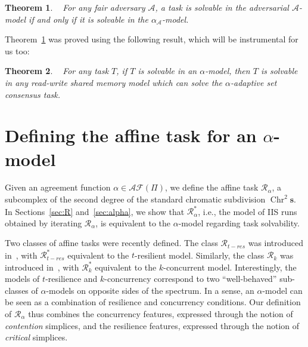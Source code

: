\documentclass[a4paper]{article}
\newtheorem{theorem}{Theorem}
\newcommand{\remove}[1]{}
\def\A{\ensuremath{\mathcal{A}}}
\def\R{\ensuremath{\mathcal{R}}}
\def\fair{\textit{fair}}
\def\s {\mathbf{s}}
\def\Chr{\operatorname{Chr}}
\begin{document}
\begin{theorem}~\cite{KR17}
\label{th:adv:task}
For any {\fair} adversary $\A$, a task is solvable in the adversarial
$\A$-model if and only if it is solvable in the $\alpha_\A$-model. %
\end{theorem} 
%

Theorem~\ref{th:adv:task} was proved using the following result, which
will be instrumental for us too:
\begin{theorem}~\cite{KR17}
\label{read/writeAndConsensus}
For any task $T$, if $T$ is solvable in an $\alpha$-model, then $T$ is solvable in \emph{any} read-write shared 
memory model which can solve the $\alpha$-adaptive set consensus task.
\end{theorem}

\remove{
%
\begin{theorem}~\cite{KR17}
  \label{thm:AdaptiveAgreement}
There exists an \emph{$\alpha$-adaptive}  set consensus algorithm
that, in any run with a participating set $P$,
satisfies the following properties: (\emph{Termination}) All \emph{correct} processes
eventually decide;
%
(\emph{Agreement}) At most $\alpha(P)$ different values are decided,
with $P$ the participation at the earliest time a process decided;
%
(\emph{Validity}) Each decided value has been proposed by some process.
\end{theorem}
}

\section{Defining the affine task for an $\alpha$-model}
\label{sec:def}

Given an agreement function $\alpha\in\mathcal{AF}(\Pi)$, 
we define the affine task $\R_\alpha$, a subcomplex of  
the second degree of the standard chromatic subdivision $\Chr^2\s$. 
In Sections~\ref{sec:R} and~\ref{sec:alpha}, we show that $\R_\alpha^*$, 
i.e., the model of IIS runs obtained by iterating $\R_\alpha$, is equivalent to 
the $\alpha$-model regarding task solvability.

Two classes of affine tasks were recently defined.
The class $\R_{t-res}$ was introduced in~\cite{SHG16}, with
$\R_{t-res}^*$ equivalent to the $t$-resilient model. 
Similarly, the class $\R_k$ was introduced in~\cite{GHKR16}, 
with $\R_k^*$ equivalent to the $k$-concurrent model.
%
Interestingly, the models of $t$-resilience and $k$-concurrency correspond to 
two ``well-behaved'' sub-classes of $\alpha$-models on opposite sides of the spectrum. 
In a sense, an $\alpha$-model can be seen as 
a combination of resilience and concurrency conditions. 
Our definition of $\R_\alpha$
thus combines the concurrency features, expressed through the notion of
\emph{contention} simplices, and the resilience features, expressed
through the notion of \emph{critical} simplices.
\end{document}
